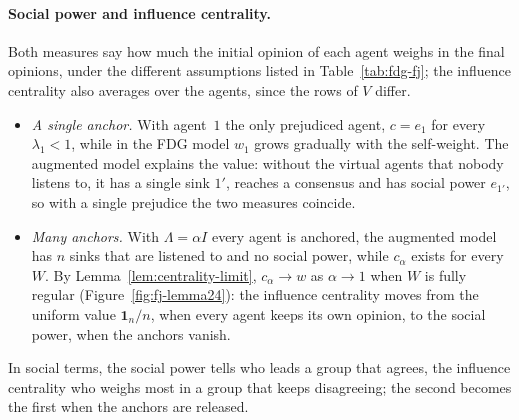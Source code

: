 \paragraph{Social power and influence centrality.}
Both measures say how much the initial opinion of each agent weighs in the final
opinions, under the different assumptions listed in Table~\ref{tab:fdg-fj}; the influence
centrality also averages over the agents, since the rows of $V$ differ.
\begin{itemize}
  \item \emph{A single anchor.} With agent~$1$ the only prejudiced agent, $c = e_1$ for
        every $\lambda_1 < 1$, while in the FDG model $w_1$ grows gradually with the
        self-weight. The augmented model explains the value: without the virtual agents
        that nobody listens to, it has a single sink $1'$, reaches a consensus and has
        social power $e_{1'}$, so with a single prejudice the two measures coincide.
  \item \emph{Many anchors.} With $\Lambda = \alpha I$ every agent is anchored, the
        augmented model has $n$ sinks that are listened to and no social power, while
        $c_\alpha$ exists for every $W$. By Lemma~\ref{lem:centrality-limit},
        $c_\alpha \to w$ as $\alpha \to 1$ when $W$ is fully regular
        (Figure~\ref{fig:fj-lemma24}): the influence centrality moves from the uniform
        value $\mathbf{1}_n/n$, when every agent keeps its own opinion, to the social
        power, when the anchors vanish.
\end{itemize}
In social terms, the social power tells who leads a group that agrees, the influence
centrality who weighs most in a group that keeps disagreeing; the second becomes the
first when the anchors are released.

